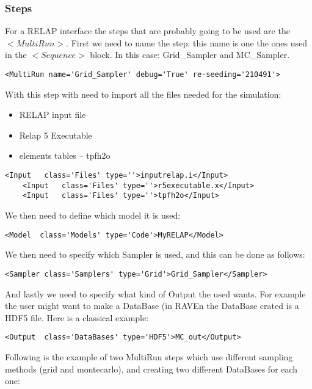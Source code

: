 \subsubsection{Steps}
For a RELAP interface the steps that are probably going to be used are the $<MultiRun>$. 
First we need to name the step: this name is one the ones used in the $<Sequence>$ block. In this case: Grid\_Sampler and MC\_Sampler.
\begin{lstlisting}[style=XML]
     <MultiRun name='Grid_Sampler' debug='True' re-seeding='210491'>
\end{lstlisting}
With this step with need to import all the files needed for the simulation:
\begin{itemize}
\item RELAP input file
\item Relap 5 Executable
\item elements tables -- tpfh2o 
\end{itemize}
\begin{lstlisting}[style=XML]
    <Input   class='Files' type=''>inputrelap.i</Input>
    <Input   class='Files' type=''>r5executable.x</Input>
    <Input   class='Files' type=''>tpfh2o</Input>
\end{lstlisting}
We then need to define which model it is used:
\begin{lstlisting}[style=XML]
    <Model  class='Models' type='Code'>MyRELAP</Model>
\end{lstlisting}
We then need to specify which Sampler is used, and this can be done as follows:
\begin{lstlisting}[style=XML]
    <Sampler class='Samplers' type='Grid'>Grid_Sampler</Sampler>
\end{lstlisting}
And lastly we need to specify what kind of Output the used wants. For example the user might want to make a DataBase (in RAVEn the DataBase crated is a HDF5 file. Here is a classical example:
\begin{lstlisting}[style=XML]
    <Output  class='DataBases' type='HDF5'>MC_out</Output>
\end{lstlisting}
Following is the example of two MultiRun steps which use different sampling methods (grid and montecarlo), and creating two different DataBases for each one:
